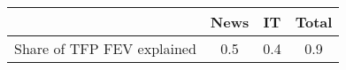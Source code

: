 \begin{small}
	\begin{tabular}{lccc}
	\hline
		& News & IT & Total \\
		\hline
		Share of TFP FEV explained & 0.5 & 0.4 & 0.9 \\
		\hline
	\end{tabular}
\end{small}
